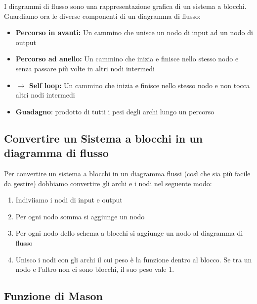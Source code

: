 \documentclass[a4paper]{article}
\begin{document}
I diagrammi di flusso sono una rappresentazione grafica di un sistema a blocchi. 
\\
Guardiamo ora le diverse componenti di un diagramma di flusso:
\begin{itemize}
    \item \textbf{Percorso in avanti:} Un cammino che unisce un nodo di input ad un nodo di output
    \item \textbf{Percorso ad anello:} Un cammino che inizia e finisce nello stesso nodo e senza passare più volte in altri nodi intermedi
    \item \textbf{$\rightarrow$ Self loop:} Un cammino che inizia e finisce nello stesso nodo e non tocca altri nodi intermedi
    \item \textbf{Guadagno}: prodotto di tutti i pesi degli archi lungo un percorso
\end{itemize}

\subsection{Convertire un Sistema a blocchi in un diagramma di flusso}

Per convertire un sistema a blocchi in un diagramma flussi (così che sia più facile da gestire) dobbiamo convertire gli archi e i nodi nel seguente modo:

\begin{enumerate}
    \item Indiviiamo i nodi di input e output
    \item Per ogni nodo somma si aggiunge un nodo 
    \item Per ogni nodo dello schema a blocchi si aggiunge un nodo al diagramma di flusso
    \item Unisco i nodi con gli archi il cui peso è la funzione dentro al blocco. Se tra un nodo e l'altro non ci sono blocchi, il suo peso vale 1.
\end{enumerate}

\subsection{Funzione di Mason}
\end{document}
